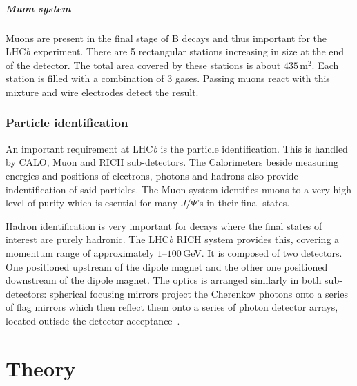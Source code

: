 \documentclass[11pt,twoside]{scrreprt}
\begin{document}
\paragraph{Muon system}
Muons are present in the final stage of B decays and thus important for the LHC\textit{b} experiment. There are 5 rectangular stations increasing in size at the end of the detector. The total area covered by these stations is about $435$\,m$^2$. Each station is filled with a combination of 3 gases. Passing muons react with this mixture and wire electrodes detect the result.


\subsection{Particle identification} %
\label{sub:particle_identification}
An important requirement at LHC\textit{b} is the particle identification. This is handled by CALO, Muon and RICH sub-detectors. The Calorimeters beside measuring energies and positions of electrons, photons and hadrons also provide indentification of said particles. The Muon system identifies muons to a very high level of purity which is esential for many \(J/\Psi\)'s in their final states.

Hadron identification is very important for decays where the final states of interest are purely hadronic. The LHC\textit{b} RICH system provides this, covering a momentum range of approximately $1$--$100$\,GeV. It is composed of two detectors. One positioned upstream of the dipole magnet and the other one positioned downstream of the dipole magnet. The optics is arranged similarly in both sub-detectors: spherical focusing mirrors project the Cherenkov photons onto a series of flag mirrors which then reflect them onto a series of photon detector arrays, located outisde the detector acceptance~\cite{Powell:2011}.



\chapter{Theory}
\end{document}

